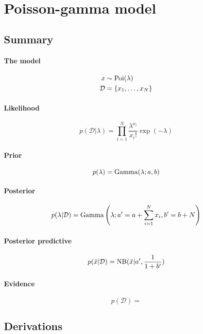 \section{Poisson-gamma model}
\subsection{Summary}
\paragraph{The model}
    \begin{align}
        x           &\sim \operatorname{Poi}(\lambda) \\
        \mathcal D  &= \{x_1, \dotsc, x_N\}
    \end{align}

\paragraph{Likelihood}
    \begin{equation}
        p(\mathcal D | \lambda) = \prod_{i = 1}^N \frac{\lambda^{x_i}}{x_i!} \exp(-\lambda)
    \end{equation}

\paragraph{Prior}
    \begin{equation}
        p(\lambda) = \operatorname{Gamma}(\lambda; a, b)
    \end{equation}

\paragraph{Posterior}
    \begin{equation}
        p(\lambda | \mathcal D) = \operatorname{Gamma}\left(\lambda; a' = a + \sum_{i = 1}^N x_i, b' = b + N\right)
    \end{equation}

\paragraph{Posterior predictive}
    \begin{align}
        p(\tilde x | \mathcal D) = \operatorname{NB}(\tilde x | a', \frac{1}{1 + b'})
    \end{align}

\paragraph{Evidence}
    \begin{equation}
        p(\mathcal D) = 
    \end{equation}

\subsection{Derivations}